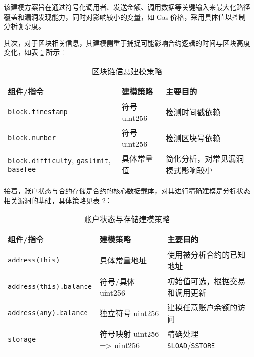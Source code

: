 \documentclass[print, master, vlined, timesmath]{DissertUESTC}
\begin{document}
该建模方案旨在通过符号化调用者、发送金额、调用数据等关键输入来最大化路径覆盖和漏洞发现能力，同时对影响较小的变量，如 Gas 价格，采用具体值以控制分析复杂度。

其次，对于区块相关信息，其建模侧重于捕捉可能影响合约逻辑的时间与区块高度变化，如表 \ref{tab:block_info_modeling} 所示：

\begin{table}[H] %
    \centering
    \caption{区块链信息建模策略}
    \begin{tabularx}{\linewidth}{ll >{\RaggedRight}X}
        \toprule
        \textbf{组件/指令} & \textbf{建模策略} & \textbf{主要目的} \\
        \midrule
        \texttt{block.timestamp} & 符号 uint256 & 检测时间戳依赖 \\
        \texttt{block.number} & 符号 uint256 & 检测区块号依赖 \\
        \texttt{block.difficulty}, \texttt{gaslimit}, \texttt{basefee} & 具体常量值 & 简化分析，对常见漏洞模式影响较小 \\
        \bottomrule
    \end{tabularx}
    \label{tab:block_info_modeling}
\end{table}



接着，账户状态与合约存储是合约的核心数据载体，对其进行精确建模是分析状态相关漏洞的基础，具体策略见表 \ref{tab:account_state_modeling}：

\begin{table}[H] %
    \centering
    \caption{账户状态与存储建模策略}
    \begin{tabularx}{\linewidth}{lll}
        \toprule
        \textbf{组件/指令} & \textbf{建模策略} & \textbf{主要目的} \\
        \midrule
        \texttt{address(this)} & 具体常量地址 & 使用被分析合约的已知地址 \\
        \texttt{address(this).balance} & 符号/具体 uint256 & 初始值可选，根据交易和调用更新 \\
        \texttt{address(any).balance} & 独立符号 uint256 & 建模任意账户余额的访问 \\
        \texttt{storage} & 符号映射 uint256 => uint256 & 精确处理 \texttt{SLOAD}/\texttt{SSTORE} \\
        \bottomrule
    \end{tabularx}
    \label{tab:account_state_modeling}
\end{table}
\end{document}
